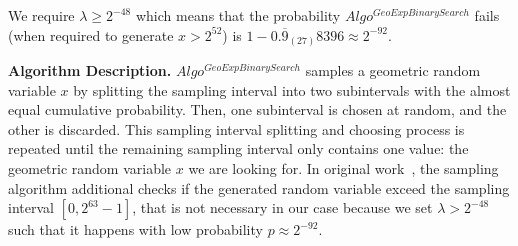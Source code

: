We require $\lambda\geq 2^{-48}$ which means that the probability $Algo^{GeoExpBinarySearch}$ fails (when required to generate $x>2^{52}$) is $ 1- 0.\overline{9}_{\left(27\right) }8396 \approx 2^{-92}$.

\textbf{Algorithm Description. }
$Algo^{GeoExpBinarySearch}$ samples a geometric random variable $x$ by splitting the sampling interval into two subintervals with the almost equal cumulative probability. Then, one subinterval is chosen at random, and the other is discarded. This sampling interval splitting and choosing process is repeated until the remaining sampling interval only contains one value: the geometric random variable $x$ we are looking for. In original work~\cite{googleDP2019}, the sampling algorithm additional checks if the generated random variable exceed the sampling interval $\left[0,  2^{63}-1\right] $, that is not necessary in our case because we set $\lambda>2^{-48}$ such that it happens with low probability $p \approx 2^{-92}$.

